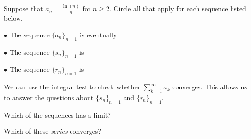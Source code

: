 \documentclass{ximera}
\author{Jim Talamo}
\begin{document}
\begin{exercise}

Suppose that $a_n = \frac{\ln(n)}{n}$ for $n \geq 2$. Circle all that apply for each sequence listed below.

$\bullet$ The sequence $\{a_n\}_{n=1}$ is eventually
\begin{selectAll}
\end{selectAll}

$\bullet$ The sequence $\{s_n\}_{n=1}$ is
\begin{selectAll}
\end{selectAll}

$\bullet$ The sequence $\{r_n\}_{n=1}$ is
\begin{selectAll}
\end{selectAll}

\begin{hint}
We can use the integral test to check whether $\sum_{k=1}^{\infty} a_k$ converges.  This allows us to answer the questions about $\{s_n\}_{n=1}$ and $\{r_n\}_{n=1}$.
\end{hint}

\begin{exercise}
Which of the sequences has a limit?
\begin{selectAll}
\end{selectAll}
\end{exercise}

\begin{exercise}
Which of these \emph{series} converges?
\begin{selectAll}
\end{selectAll}
\end{exercise}

\end{exercise}
\end{document}
